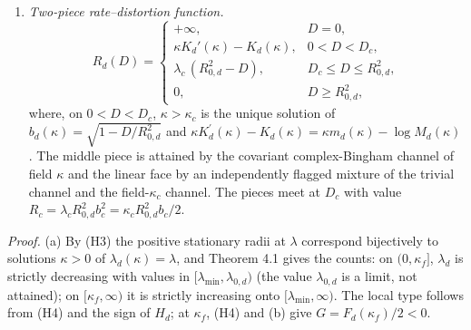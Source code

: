 \documentclass[
  11pt,
  a4paper,
]{article}
\begin{document}
\begin{enumerate}
\item
  \emph{Two-piece rate--distortion function.}
  \[R_d(D)=\begin{cases}+\infty,& D=0,\\[2pt] \kappa K_d'(\kappa)-K_d(\kappa), & 0<D<D_c,\\[2pt] \lambda_c\,(R_{0,d}^2-D), & D_c\le D\le R_{0,d}^2,\\[2pt] 0,& D\ge R_{0,d}^2,\end{cases}\]
  where, on \(0<D<D_c\), \(\kappa>\kappa_c\) is the unique solution of
  \(b_d(\kappa)=\sqrt{1-D/R_{0,\allowbreak{}d}^2}\) and
  \(\kappa K_d^{\prime}(\kappa)-K_d(\kappa)=\kappa m_d(\kappa)-\log M_d(\kappa)\).
  The middle piece is attained by the covariant complex-Bingham channel
  of field \(\kappa\) and the linear face by an independently flagged
  mixture of the trivial channel and the field-\(\kappa_c\) channel. The
  pieces meet at \(D_c\) with value
  \(R_c=\lambda_cR_{0,\allowbreak{}d}^2b_c^2=\kappa_cR_{0,\allowbreak{}d}^2b_c/2\).
\end{enumerate}

\emph{Proof.} (a) By (H3) the positive stationary radii at \(\lambda\)
correspond bijectively to solutions \(\kappa>0\) of
\(\lambda_d(\kappa)=\lambda\), and Theorem 4.1 gives the counts: on
\((0,\allowbreak{}\kappa_f]\), \(\lambda_d\) is strictly decreasing with values in
\([\lambda_{\min},\allowbreak{}\lambda_{0,\allowbreak{}d})\) (the value \(\lambda_{0,\allowbreak{}d}\) is a
limit, not attained); on \([\kappa_f,\allowbreak{}\infty)\) it is strictly increasing
onto \([\lambda_{\min},\allowbreak{}\infty)\). The local type follows from (H4) and
the sign of \(H_d\); at \(\kappa_f\), (H4) and (b) give
\(G=F_d(\kappa_f)/2<0\).
\end{document}
